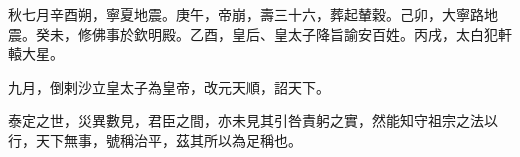 \begin{pinyinscope}
 秋七月辛酉朔，寧夏地震。庚午，帝崩，壽三十六，葬起輦穀。己卯，大寧路地震。癸未，修佛事於欽明殿。乙酉，皇后、皇太子降旨諭安百姓。丙戌，太白犯軒轅大星。



 九月，倒剌沙立皇太子為皇帝，改元天順，詔天下。



 泰定之世，災異數見，君臣之間，亦未見其引咎責躬之實，然能知守祖宗之法以行，天下無事，號稱治平，茲其所以為足稱也。



\end{pinyinscope}